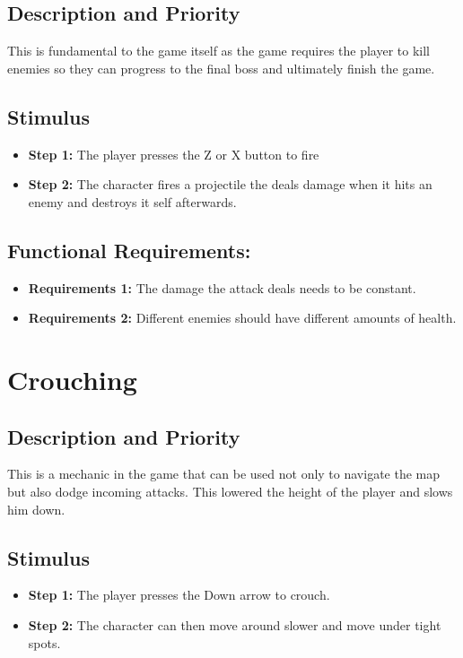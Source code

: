 \subsection{Description and Priority}
This is fundamental to the game itself as the game requires the player to kill enemies so they can progress to the final boss and ultimately finish the game.
\subsection{Stimulus}
\begin{itemize}
    \item \textbf{Step 1:} The player presses the Z or X button to fire
    \item \textbf{Step 2:} The character fires a projectile the deals damage when it hits an enemy and destroys it self afterwards.
\end{itemize}
\subsection{Functional Requirements:}
\begin{itemize}
    \item \textbf{Requirements 1:} The damage the attack deals needs to be constant.
    \item \textbf{Requirements 2:} Different enemies should have different amounts of health.
\end{itemize}

\section{Crouching}
\subsection{Description and Priority}
This is a mechanic in the game that can be used not only to navigate the map but also dodge incoming attacks. This lowered the height of the player and slows him down.
\subsection{Stimulus}
\begin{itemize}
    \item \textbf{Step 1:} The player presses the Down arrow to crouch.
    \item \textbf{Step 2:} The character can then move around slower and move under tight spots. 
\end{itemize}
